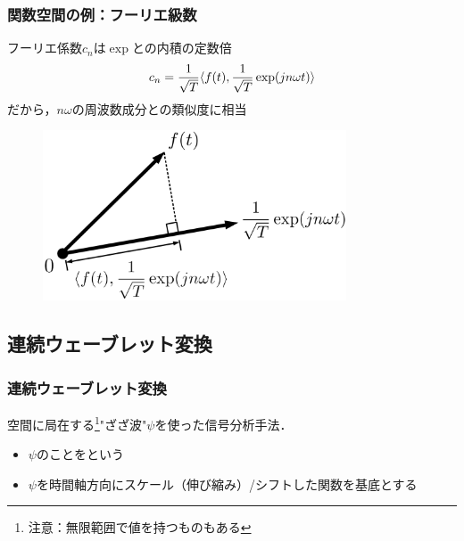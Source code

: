 \documentclass[dvipdfmx,graphicx,14pt]{beamer}
\begin{document}
\begin{frame}[c]
    \frametitle{関数空間の例：フーリエ級数}
    フーリエ係数$c_{n}$は$\exp$との内積の定数倍
    \begin{align}
        c_{n} = \frac{1}{\sqrt{T}} \langle f(t), \frac{1}{\sqrt{T}}\exp(jn\omega t) \rangle
    \end{align}
    だから，$n\omega$の周波数成分との類似度に相当
    \begin{figure}
        \includegraphics[width=90mm]{./figs/fourior_function_projection.png}
    \end{figure}
\end{frame}

\subsection{連続ウェーブレット変換}

\begin{frame}[c]
    \frametitle{連続ウェーブレット変換}
    空間に局在する\footnote{注意：無限範囲で値を持つものもある}"ざざ波"$\psi$を使った信号分析手法．
    \begin{itemize}
        \item $\psi$のことをという
        \item $\psi$を時間軸方向にスケール（伸び縮み）/シフトした関数を基底とする
    \end{itemize}
\end{frame}
\end{document}
